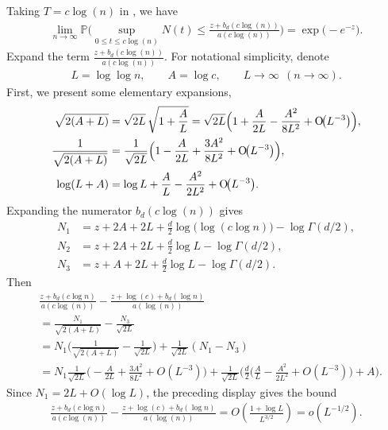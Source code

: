\documentclass[10pt]{article}
\newcommand{\bigo}[1]{\operatorname{O}\!\bigl(#1\bigr)}
\def\P{\mathbb{P}}
\theoremstyle{definition}
\theoremstyle{remark}
\begin{document}
Taking $T = c \log(n)$ in \citet[Lemma 2.1]{horvath1993maximum}, we have
\begin{align*}
        \lim_{n \rightarrow \infty}\P \bigg(\sup_{0 \leq t \leq c \log (n)} N(t)  \leq \frac{z + b_d(c\log (n))}{a(c \log(n))} \bigg) = \exp \Big(-e^{-z} \Big).
\end{align*}
Expand the term $\frac{z + b_d(c\log (n))}{a(c \log(n))}$. For notational simplicity, denote
\begin{align*}  
      L = \log\log n, \qquad A = \log c,   \qquad
  L \to \infty \ \ (n \to \infty).
\end{align*}
First, we present some elementary expansions,
\[
\begin{aligned}
\sqrt{2(A+L)}
   &= \sqrt{2L}\,\sqrt{1+\frac{A}{L}}
    = \sqrt{2L}\Bigl(1+\frac{A}{2L}-\frac{A^{2}}{8L^{2}}
      +\bigo{L^{-3}}\Bigr), \\
\frac{1}{\sqrt{2(A+L)}}
   &= \frac{1}{\sqrt{2L}}
      \Bigl(1-\frac{A}{2L}+\frac{3A^{2}}{8L^{2}}
      +\bigo{L^{-3}}\Bigr), \\
    \log(L+A)
    &= \log L + \frac{A}{L} - \frac{A^{2}}{2L^{2}} + \bigo{L^{-3}}.
\end{aligned}
\]
Expanding the numerator $b_d(c \log(n))$ gives
\[
\begin{aligned}
N_{1} &= z + 2A + 2L + \frac{d}{2}\log \bigl(\log(c\log n)\bigr)
        - \log \Gamma(d/2),\\
N_{2} &= z + 2A + 2L + \frac{d}{2}\log L - \log \Gamma(d/2),\\
N_{3} &= z + A  + 2L + \frac{d}{2}\log L - \log \Gamma(d/2).
\end{aligned}
\]
Then
\begin{align*}
    & \frac{z + b_d(c \log n)}{a(c \log(n))} - \frac{z + \log(c) + b_d(\log n)}{a(\log(n))} \\
   & = \frac{N_1}{\sqrt{2(A+L)}} - \frac{N_3}{\sqrt{2L}} \\
    & = N_1 \bigg(\frac{1}{\sqrt{2(A + L)}} - \frac{1}{\sqrt{2 L}}\bigg) + \frac{1}{\sqrt{2 L}}(N_1 - N_3) \\
    & = N_1 \frac{1}{\sqrt{2 L}} \bigg(- \frac{A}{2 L} + \frac{3 A^2}{8 L^2} + O(L^{-3}) \bigg) + \frac{1}{\sqrt{2 L}} \bigg(\frac{d}{2} \Big(\frac{A}{L} - \frac{A^2}{2 L^2} + O(L^{-3})\Big) + A\bigg).
\end{align*}
Since $N_1 = 2L + O(\log L)$, the preceding display gives the bound
\begin{align*}
    \frac{z + b_d(c \log n)}{a(c \log(n))} - \frac{z + \log(c) + b_d(\log n)}{a(\log(n))}
    = O\!\left(\frac{1+\log L}{L^{3/2}}\right)
    = o(L^{-1/2}).
\end{align*}
\end{document}

